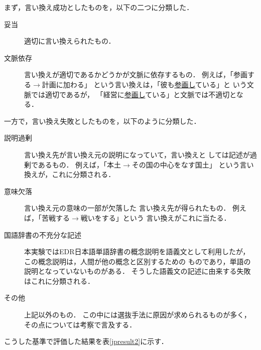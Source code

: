 まず，言い換え成功としたものを，以下の二つに分類した．
\begin{description}
 \item[妥当]  適切に言い換えられたもの．
		   
 \item[文脈依存]		   
	    言い換えが適切であるかどうかが文脈に依存するもの．
	    例えば，「参画する$\rightarrow$計画に加わる」
	    という言い換えは，「彼も\underline{参画し}ている」と
	    いう文脈では適切であるが，
	    「経営に\underline{参画し}ている」と文脈では不適切となる．
\end{description}

\noindent
一方で，言い換え失敗としたものを，以下のように分類した．

\begin{description}
 \item[説明過剰]
	    言い換え先が言い換え元の説明になっていて，言い換えと
	    しては記述が過剰であるもの．
	    例えば，「本土$\rightarrow$その国の中心をなす国土」
	    という言い換えが，これに分類される．

 \item[意味欠落]
	    言い換え元の意味の一部が欠落した
	    言い換え先が得られたもの．
	    例えば，「苦戦する$\rightarrow$戦いをする」という
	    言い換えがこれに当たる．

 \item[国語辞書の不充分な記述]
	    本実験ではEDR日本語単語辞書の概念説明を語義文として利用したが，
	    この概念説明は，人間が他の概念と区別するための
	    ものであり，単語の説明となっていないものがある．
	    そうした語義文の記述に由来する失敗はこれに分類される．
		   
 \item[その他]
	    上記以外のもの．
	    この中には選抜手法に原因が求められるものが多く，その点については考察で言及する．
		   
\end{description}
こうした基準で評価した結果を表\ref{jpresult2}に示す．

